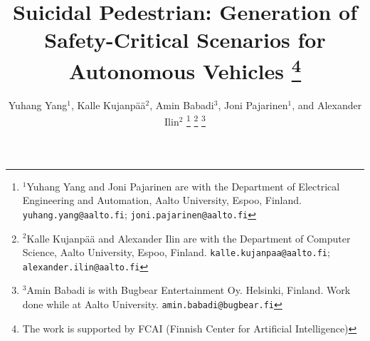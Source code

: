 \documentclass[letterpaper, 10 pt, conference]{ieeeconf}
\begin{document}
\title{\LARGE \bf Suicidal Pedestrian: Generation of Safety-Critical Scenarios for Autonomous Vehicles
\thanks{The work is supported by FCAI (Finnish Center for Artificial Intelligence)}
}





\author{Yuhang Yang$^{1}$, Kalle Kujanpää$^{2}$, Amin Babadi$^{3}$, Joni Pajarinen$^{1}$, and Alexander Ilin$^{2}$
\thanks{$^{1}$Yuhang Yang and Joni Pajarinen are with the Department of Electrical Engineering and Automation, Aalto University, Espoo, Finland. {\tt\footnotesize yuhang.yang@aalto.fi}; {\tt\footnotesize joni.pajarinen@aalto.fi}}
\thanks{$^{2}$Kalle Kujanpää and Alexander Ilin are with the Department of Computer Science, Aalto University, Espoo, Finland. {\tt\footnotesize kalle.kujanpaa@aalto.fi}; {\tt\footnotesize alexander.ilin@aalto.fi}}
\thanks{$^{3}$Amin Babadi is with Bugbear Entertainment Oy. Helsinki, Finland. Work done while at Aalto University. {\tt\footnotesize amin.babadi@bugbear.fi}}
}
\end{document}
